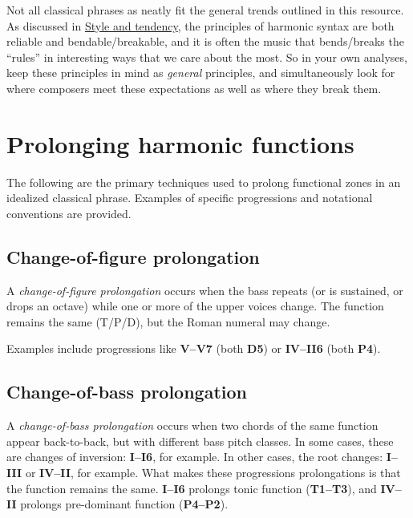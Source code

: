 \documentclass{book}
\begin{document}
Not all classical phrases as neatly fit the general trends outlined in this
resource. As discussed in \href{tendency}{Style and tendency}, the principles
of harmonic syntax are both reliable and bendable/breakable, and it is often
the music that bends/breaks the ``rules'' in interesting ways that we care
about the most. So in your own analyses, keep these principles in mind as
\emph{general} principles, and simultaneously look for where composers meet
these expectations as well as where they break them.

\hypertarget{prolonging-harmonic-functions}{%
\section{Prolonging harmonic functions}\label{prolonging-harmonic-functions}}

The following are the primary techniques used to prolong functional zones in
an idealized classical phrase. Examples of specific progressions and
notational conventions are provided.

\hypertarget{change-of-figure-prolongation}{%
\subsection{Change-of-figure
prolongation}\label{change-of-figure-prolongation}}

A \emph{change-of-figure prolongation} occurs when the bass repeats (or is
sustained, or drops an octave) while one or more of the upper voices change.
The function remains the same (T/P/D), but the Roman numeral may change.

Examples include progressions like \textbf{V--V7} (both \textbf{D5}) or
\textbf{IV--II6} (both \textbf{P4}).

\hypertarget{change-of-bass-prolongation}{%
\subsection{Change-of-bass prolongation}\label{change-of-bass-prolongation}}

A \emph{change-of-bass prolongation} occurs when two chords of the same
function appear back-to-back, but with different bass pitch classes. In some
cases, these are changes of inversion: \textbf{I--I6}, for example. In other
cases, the root changes: \textbf{I--III} or \textbf{IV--II}, for example. What
makes these progressions prolongations is that the function remains the same.
\textbf{I--I6} prolongs tonic function (\textbf{T1--T3}), and \textbf{IV--II}
prolongs pre-dominant function (\textbf{P4--P2}).
\end{document}

